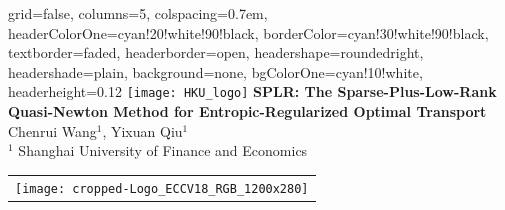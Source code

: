 \documentclass[a0paper,landscape]{baposter}
\begin{document}
    \begin{poster}
    {
        grid=false,
        columns=5,
        colspacing=0.7em,
        headerColorOne=cyan!20!white!90!black,
        borderColor=cyan!30!white!90!black,
        textborder=faded,
        headerborder=open,
        headershape=roundedright,
        headershade=plain,
        background=none,
        bgColorOne=cyan!10!white,
        headerheight=0.12\textheight
    }
    {
        \texttt{[image: HKU\_logo]}
        \makebox[0.01\textwidth]{} 
        \makebox[0.04\textwidth]{} 
    }
    {\sc\huge\bf SPLR: The Sparse-Plus-Low-Rank Quasi-Newton Method for Entropic-Regularized Optimal Transport}
    {
        \vspace{0.3em}
        Chenrui Wang$^1$, Yixuan Qiu$^1$ \\[0.2em]
        $^1$ Shanghai University of Finance and Economics \\[0.2em]
    }
    {
        \begin{tabular}{r}
            \texttt{[image: cropped-Logo\_ECCV18\_RGB\_1200x280]}
        \end{tabular}
    }



\end{poster}
\end{document}
